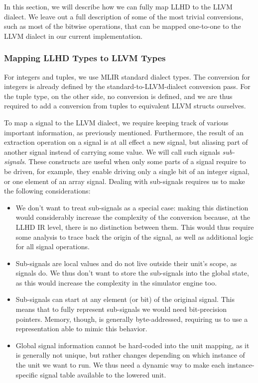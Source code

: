 In this section, we will describe how we can fully map LLHD to the LLVM dialect. We leave out a full description of some of the most trivial conversions, such as most of the bitwise operations, that can be mapped one-to-one to the LLVM dialect in our current implementation.


\subsubsection{Mapping LLHD Types to LLVM Types}
\label{sec:typeconv}
For integers and tuples, we use MLIR standard dialect types. The conversion for integers is already defined by the standard-to-LLVM-dialect conversion pass. For the tuple type, on the other side, no conversion is defined, and we are thus required to add a conversion from tuples to equivalent LLVM structs ourselves.

To map a signal to the LLVM dialect, we require keeping track of various important information, as previously mentioned. Furthermore, the result of an extraction operation on a signal is at all effect a new signal, but aliasing part of another signal instead of carrying some value. We will call such signals \textit{sub-signals}. These constructs are useful when only some parts of a signal require to be driven, for example, they enable driving only a single bit of an integer signal, or one element of an array signal.
Dealing with sub-signals requires us to make the following considerations:

\begin{itemize}
    \item We don't want to treat sub-signals as a special case: making this distinction would considerably increase the complexity of the conversion because, at the LLHD IR level, there is no distinction between them. This would thus require some analysis to trace back the origin of the signal, as well as additional logic for all signal operations.
    \item Sub-signals are local values and do not live outside their unit's scope, as signals do. We thus don't want to store the sub-signals into the global state, as this would increase the complexity in the simulator engine too.
    \item Sub-signals can start at any element (or bit) of the original signal. This means that to fully represent sub-signals we would need bit-precision pointers. Memory, though, is generally byte-addressed, requiring us to use a representation able to mimic this behavior.
    \item Global signal information cannot be hard-coded into the unit mapping, as it is generally not unique, but rather changes depending on which instance of the unit we want to run. We thus need a dynamic way to make each instance-speciﬁc signal table available to the lowered unit.
\end{itemize}

